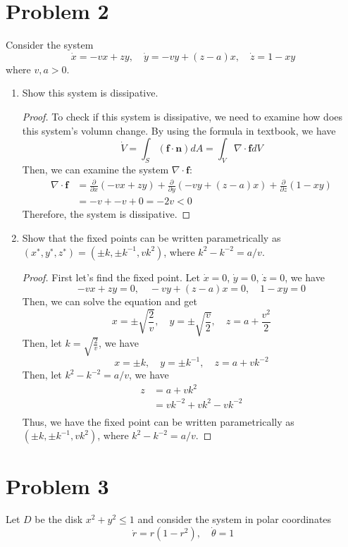 \documentclass[12pt]{exam}
\begin{document}
\section*{Problem 2}
Consider the system
\[ \dot{x} = -vx+zy, \quad \dot{y} = -vy + (z-a)x, \quad \dot{z} = 1-xy \]
where $v, a > 0$.

\begin{enumerate}
	\item Show this system is dissipative. 
	\begin{proof}
	To check if this system is dissipative, we need to examine how does this system's volumn change. By using the formula in textbook, we have
	\[ \dot{V}  = \int_S (\mathbf{f} \cdot \mathbf{n}) dA = \int_V \nabla \cdot \mathbf{f} dV \]
	Then, we can examine the system $\nabla \cdot \mathbf{f}$:
	\begin{align*}
		\nabla \cdot \mathbf{f} &= \frac{\partial}{\partial x} (-vx+zy) + \frac{\partial}{\partial y} (-vy + (z-a)x) + \frac{\partial}{\partial z} (1-xy) \\
		&= -v + -v +0 = -2v < 0
	\end{align*}
	Therefore, the system is dissipative.
	\end{proof}

	\item Show that the fixed points can be written parametrically as $(x^∗,y^∗,z^∗)=(\pm k,\pm k^{−1},vk^2)$, where $k^2 − k^{−2} = a/v$. 
	\begin{proof}
	First let's find the fixed point. Let $\dot{x} = 0$, $\dot{y} = 0$, $\dot{z} = 0$, we have
	\[ -vx+zy = 0, \quad -vy + (z-a)x = 0, \quad 1-xy = 0 \]
	Then, we can solve the equation and get
	\[ x = \pm \sqrt{\frac{2}{v}}, \quad y = \pm \sqrt{\frac{v}{2}}, \quad z = a + \frac{v^{2}}{2} \]
	Then, let $k = \sqrt{\frac{2}{v}}$, we have
	\[ x = \pm k, \quad y = \pm k^{-1}, \quad z = a + vk^{-2} \]
	Then, let $k^2 - k^{-2} = a/v$, we have
	\begin{align*}
	z &= a + vk^2 \\	
	  &= vk^{-2} + vk^2 - vk^{-2} \\
	\end{align*}
	Thus, we have the fixed point can be written parametrically as $(\pm k,\pm k^{−1},vk^2)$, where $k^2 − k^{−2} = a/v$.
	\end{proof}
\end{enumerate}


\section*{Problem 3}
Let $D$ be the disk $x^2 + y^2 \leq 1$ and consider the system in polar coordinates
\[ \dot{r} = r(1-r^2), \quad \dot{\theta} = 1 \]
\end{document}
